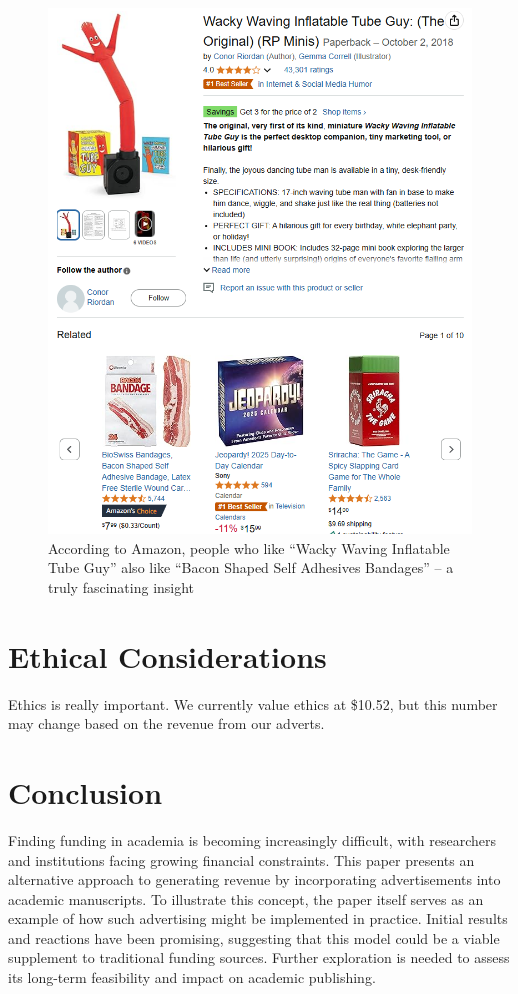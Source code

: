 \documentclass[letterpaper, twocolumn]{article}
\begin{document}
	\begin{figure}[tbh]
		\begin{center}
			\includegraphics[width=0.9\linewidth]{figs/amazon.png}
			\caption{According to Amazon, people who like ``Wacky Waving Inflatable Tube Guy'' also like ``Bacon Shaped Self Adhesives Bandages'' -- a truly fascinating insight}
			\label{fig:amazon}
		\end{center}
	\end{figure} 

	\section{Ethical Considerations}\label{sec:ethics}
	Ethics is really important. We currently value ethics at \$10.52, but this number may change based on the revenue from our adverts.
	
	\section{Conclusion}\label{sec:conclusion}
	Finding funding in academia is becoming increasingly difficult, with researchers and institutions facing growing financial constraints. This paper presents an alternative approach to generating revenue by incorporating advertisements into academic manuscripts. To illustrate this concept, the paper itself serves as an example of how such advertising might be implemented in practice. Initial results and reactions have been promising, suggesting that this model could be a viable supplement to traditional funding sources. Further exploration is needed to assess its long-term feasibility and impact on academic publishing.
	
\end{document}
